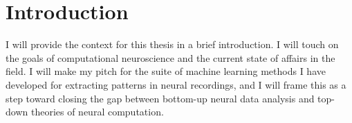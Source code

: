 \chapter{Introduction}
\label{introduction}

I will provide the context for this thesis in a brief introduction.
I will touch on the goals of computational neuroscience and the current 
state of affairs in the field. I will make my pitch for the suite of 
machine learning methods I have developed for extracting patterns in neural recordings,
and I will frame this as a step toward closing the gap between bottom-up
neural data analysis and top-down theories of neural computation.

